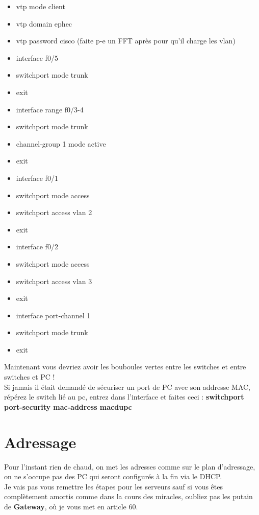 \documentclass[a4paper,10pt,final,fleqn]{article}
\begin{document}
	\begin{itemize}
		\item vtp mode client
		\item vtp domain ephec
		\item vtp password cisco (faite p-e un FFT après pour qu'il charge les vlan)
		\item interface f0/5
		\item switchport mode trunk
		\item exit
		\item interface range f0/3-4
		\item switchport mode trunk
		\item channel-group 1 mode active
		\item exit
		\item interface f0/1
		\item switchport mode access
		\item switchport access vlan 2
		\item exit
		\item interface f0/2
		\item switchport mode access
		\item switchport access vlan 3
		\item exit
		\item interface port-channel 1
		\item switchport mode trunk
		\item exit \\
	\end{itemize}

	Maintenant vous devriez avoir les bouboules vertes entre les switches et entre switches et PC ! \\

	Si jamais il était demandé de sécuriser un port de PC avec son addresse MAC, répérez le switch lié au pc, entrez dans l'interface et faites ceci : \textbf{switchport port-security mac-address macdupc}\\


\section{Adressage}

	Pour l'instant rien de chaud, on met les adresses comme sur le plan d'adressage, on ne s'occupe pas des PC qui seront configurés à la fin via le DHCP.\\
	Je vais pas vous remettre les étapes pour les serveurs sauf si vous êtes complètement amortis comme dans la cours des miracles, oubliez pas les putain de \textbf{Gateway}, où je vous met en article 60.\\
\end{document}
